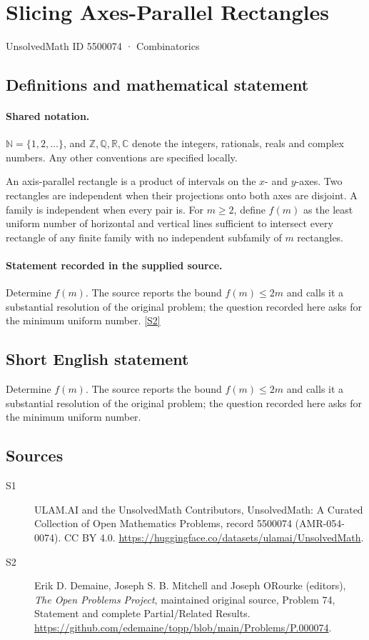 \documentclass[11pt]{article}
\newcommand{\sref}[2]{\hyperlink{source:#1:#2}{[S#2]}}
\begin{document}
\setcounter{section}{5500073}
\section{Slicing Axes-Parallel Rectangles}\label{5500074}
{\small\sffamily UnsolvedMath ID 5500074 · Combinatorics}
\subsection{Definitions and mathematical statement}

\paragraph{Shared notation.}$\mathbb N=\{1,2,\ldots\}$, and $\mathbb Z,\mathbb Q,\mathbb R,\mathbb C$ denote the integers, rationals, reals and complex numbers. Any other conventions are specified locally.


An axis-parallel rectangle is a product of intervals on the $x$- and $y$-axes. Two rectangles are independent when their projections onto both axes are disjoint. A family is independent when every pair is. For $m\ge2$, define $f(m)$ as the least uniform number of horizontal and vertical lines sufficient to intersect every rectangle of any finite family with no independent subfamily of $m$ rectangles.
\paragraph{Statement recorded in the supplied source.}
Determine $f(m)$. The source reports the bound $f(m)\le2m$ and calls it a substantial resolution of the original problem; the question recorded here asks for the minimum uniform number. \sref{5500074}{2}
\subsection{Short English statement}
Determine $f(m)$. The source reports the bound $f(m)\le2m$ and calls it a substantial resolution of the original problem; the question recorded here asks for the minimum uniform number.
\subsection{Sources}
\begin{description}
\item[\hypertarget{source:5500074:1}{S1}] ULAM.AI and the UnsolvedMath Contributors, UnsolvedMath: A Curated Collection of Open Mathematics Problems, record 5500074 (AMR-054-0074). CC BY 4.0. \url{https://huggingface.co/datasets/ulamai/UnsolvedMath}.
\item[\hypertarget{source:5500074:2}{S2}] Erik D. Demaine, Joseph S. B. Mitchell and Joseph O\textquotesingle Rourke (editors), \emph{The Open Problems Project}, maintained original source, Problem 74, Statement and complete Partial/Related Results. \url{https://github.com/edemaine/topp/blob/main/Problems/P.000074}.
\end{description}
\label{end:5500074}
\end{document}
